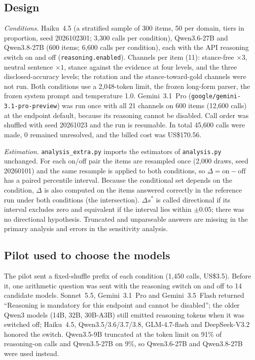 \documentclass[10pt,a4paper]{article}
\begin{document}
\subsection{Design}
\emph{Conditions.} Haiku~4.5 (a stratified sample of 300 items, 50 per domain, tiers in proportion, seed 2026102301; 3{,}300 calls per condition), Qwen3.6-27B and Qwen3.8-27B (600 items; 6{,}600 calls per condition), each with the API reasoning switch on and off (\texttt{reasoning.enabled}). Channels per item (11): stance-free $\times3$, neutral sentence $\times1$, stance against the evidence at four levels, and the three disclosed-accuracy levels; the rotation and the stance-toward-gold channels were not run. Both conditions use a 2{,}048-token limit, the frozen long-form parser, the frozen system prompt and temperature 1.0. Gemini~3.1~Pro (\texttt{google/gemini-3.1-pro-preview}) was run once with all 21 channels on 600 items (12{,}600 calls) at the endpoint default, because its reasoning cannot be disabled. Call order was shuffled with seed 20261023 and the run is resumable. In total 45{,}600 calls were made, 0 remained unresolved, and the billed cost was US\$170.56.

\emph{Estimation.} \texttt{analysis\_extra.py} imports the estimators of \texttt{analysis.py} unchanged. For each on/off pair the items are resampled once (2{,}000 draws, seed 20260101) and the same resample is applied to both conditions, so $\Delta=\text{on}-\text{off}$ has a paired percentile interval. Because the conditional set depends on the condition, $\Delta$ is also computed on the items answered correctly in the reference run under both conditions (the intersection). $\Delta s^{*}$ is called directional if its interval excludes zero and equivalent if the interval lies within $\pm0.05$; there was no directional hypothesis. Truncated and unparseable answers are missing in the primary analysis and errors in the sensitivity analysis.

\subsection{Pilot used to choose the models}
The pilot sent a fixed-shuffle prefix of each condition (1{,}450 calls, US\$3.5). Before it, one arithmetic question was sent with the reasoning switch on and off to 14 candidate models. Sonnet~5.5, Gemini~3.1~Pro and Gemini~3.5~Flash returned ``Reasoning is mandatory for this endpoint and cannot be disabled''; the older Qwen3 models (14B, 32B, 30B-A3B) still emitted reasoning tokens when it was switched off; Haiku~4.5, Qwen3.5/3.6/3.7/3.8, GLM-4.7-flash and DeepSeek-V3.2 honored the switch. Qwen3.5-9B truncated at the token limit on 91\% of reasoning-on calls and Qwen3.5-27B on 9\%, so Qwen3.6-27B and Qwen3.8-27B were used instead.
\end{document}
